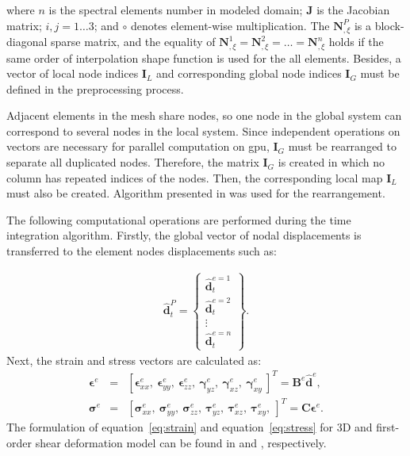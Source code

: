 where $n$ is the spectral elements number in modeled domain; \textbf{J} is the Jacobian matrix; $i,j=1\ldots3$; and $\circ$ denotes element-wise multiplication.
The $\textbf{N}^P_{,\xi}$ is a block-diagonal sparse matrix, and the equality of $\textbf{N}^1_{,\xi}=\textbf{N}^2_{,\xi}=\ldots=\textbf{N}^n_{,\xi}$ holds if the same order of interpolation shape function is used for the all elements.
Besides, a vector of local node indices $\textbf{I}_L$ and corresponding global node indices $\textbf{I}_G$ must be defined in the preprocessing process.

Adjacent elements in the mesh share nodes, so one node in the global system can correspond to several nodes in the local system.
Since independent operations on vectors are necessary for parallel computation on \ac{gpu}, $\textbf{I}_G$ must be rearranged to separate all duplicated nodes.
Therefore, the matrix $\textbf{I}_G$ is created in which no column has repeated indices of the nodes.
Then, the corresponding local map $\textbf{I}_L$ must also be created.
Algorithm presented in \cite{kudela2016parallel} was used for the rearrangement.

The following computational operations are performed during the time integration algorithm. Firstly, the global vector of nodal displacements is transferred to the element nodes displacements such as:

\begin{eqnarray}
	\widehat{\textbf{d}}_t^P = \left\{ \begin{array}{c}
		\widehat{\textbf{d}}_t^{e=1}\\
		\widehat{\textbf{d}}_t^{e=2}\\
		\vdots\\
		\widehat{\textbf{d}}_t^{e=n} \end{array}\right\}.
\end{eqnarray}
Next, the strain and stress vectors are calculated as:
\begin{eqnarray}
	\label{eq:strain}
	\boldsymbol{\epsilon}^e & = & \left[\boldsymbol{\epsilon}^e_{xx},\ \boldsymbol{\epsilon}^e_{yy},\ \boldsymbol{\epsilon}^e_{zz},\ \boldsymbol{\gamma}^e_{yz},\ \boldsymbol{\gamma}^e_{xz},\ \boldsymbol{\gamma}^e_{xy}\ \right]^T=\textbf{B}^e\widehat{\textbf{d}}^e,\\
	\label{eq:stress}
	\boldsymbol{\sigma}^e & = & \left[\boldsymbol{\sigma}^e_{xx},\ \boldsymbol{\sigma}^e_{yy},\ \boldsymbol{\sigma}^e_{zz},\ \boldsymbol{\tau}^e_{yz},\ \boldsymbol{\tau}^e_{xz},\ \boldsymbol{\tau}^e_{xy},\ \right]^T=\textbf{C}\boldsymbol{\epsilon}^e.
\end{eqnarray}
The formulation of equation~\ref{eq:strain} and equation~\ref{eq:stress} for 3D and first-order shear deformation model can be found in \cite{kudela2016parallel} and \cite{kudela2020parallel}, respectively.

